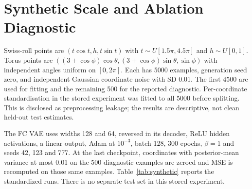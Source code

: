 \documentclass[make,article,submit,pdftex,moreauthors]{Definitions/mdpi}
\begin{document}
\section{Synthetic Scale and Ablation Diagnostic}\label{app:synthetic}
Swiss-roll points are $(t\cos t,h,t\sin t)$ with
$t\sim U[1.5\pi,4.5\pi]$ and $h\sim U[0,1]$. Torus points are
$((3+\cos\phi)\cos\theta,(3+\cos\phi)\sin\theta,\sin\phi)$ with
independent angles uniform on $[0,2\pi]$. Each has 5000 examples,
generation seed zero, and independent Gaussian coordinate noise with
SD 0.01. The first 4500 are used for fitting and the remaining 500 for
the reported diagnostic. Per-coordinate standardisation in the stored
experiment was fitted to all 5000 before splitting. This is disclosed
as preprocessing leakage; the results are descriptive, not clean
held-out test estimates.

The FC VAE uses widths 128 and 64, reversed in its decoder, ReLU hidden
activations, a linear output, Adam at $10^{-3}$, batch 128, 300 epochs,
$\beta=1$ and seeds 42, 123 and 777. At the last checkpoint, coordinates
with posterior-mean variance at most 0.01 on the 500 diagnostic examples
are zeroed and MSE is recomputed on those same examples.
Table~\ref{tab:synthetic} reports the standardized runs. There is no
separate test set in this stored experiment.
\end{document}

